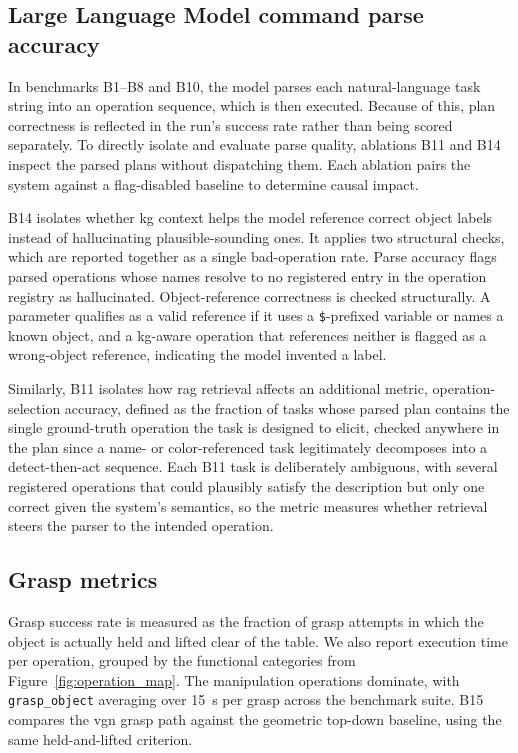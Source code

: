 \subsection{Large Language Model command parse accuracy}
In benchmarks B1–B8 and B10, the model parses each natural-language task string into an operation sequence, which is then executed. Because of this, plan correctness is reflected in the run’s success rate rather than being scored separately. To directly isolate and evaluate parse quality, ablations B11 and B14 inspect the parsed plans without dispatching them. Each ablation pairs the system against a flag-disabled baseline to determine causal impact.

B14 isolates whether \gls{kg} context helps the model reference correct object labels instead of hallucinating plausible-sounding ones. It applies two structural checks, which are reported together as a single bad-operation rate. Parse accuracy flags parsed operations whose names resolve to no registered entry in the operation registry as hallucinated. Object-reference correctness is checked structurally. A parameter qualifies as a valid reference if it uses a \texttt{\$}-prefixed variable or names a known object, and a \gls{kg}-aware operation that references neither is flagged as a wrong-object reference, indicating the model invented a label.

Similarly, B11 isolates how \gls{rag} retrieval affects an additional metric, operation-selection accuracy, defined as the fraction of tasks whose parsed plan contains the single ground-truth operation the task is designed to elicit, checked anywhere in the plan since a name- or color-referenced task legitimately decomposes into a detect-then-act sequence. Each B11 task is deliberately ambiguous, with several registered operations that could plausibly satisfy the description but only one correct given the system’s semantics, so the metric measures whether retrieval steers the parser to the intended operation.

\subsection{Grasp metrics}
Grasp success rate is measured as the fraction of grasp attempts in which the object is actually held and lifted clear of the table. We also report execution time per operation, grouped by the functional categories from Figure~\ref{fig:operation_map}. The manipulation operations dominate, with \texttt{grasp\_object} averaging over 15~s per grasp across the benchmark suite. B15 compares the \gls{vgn} grasp path against the geometric top-down baseline, using the same held-and-lifted criterion.

